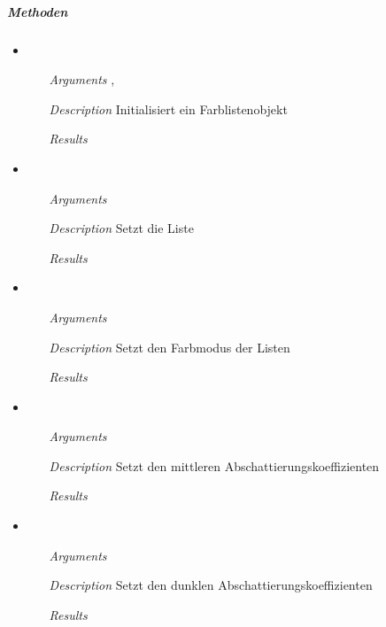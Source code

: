 \subparagraph{Methoden}
\begin{itemize}

\item {}
\begin{enumerate}
\item[\textit{Arguments}] , 
\item[\textit{Description}] Initialisiert ein 
Farblistenobjekt
\item[\textit{Results}] 
\end{enumerate}

\item {}
\begin{enumerate}
\item[\textit{Arguments}] 
\item[\textit{Description}] Setzt die Liste 
\item[\textit{Results}] 
\end{enumerate}

\item {}
\begin{enumerate}
\item[\textit{Arguments}] 
\item[\textit{Description}] Setzt den Farbmodus der Listen
\item[\textit{Results}] 
\end{enumerate}

\item {}
\begin{enumerate}
\item[\textit{Arguments}] 
\item[\textit{Description}] Setzt den mittleren 
Abschattierungskoeffizienten
\item[\textit{Results}] 
\end{enumerate}

\item {}
\begin{enumerate}
\item[\textit{Arguments}] 
\item[\textit{Description}] Setzt den dunklen 
Abschattierungskoeffizienten 
\item[\textit{Results}] 
\end{enumerate}


\end{itemize}
